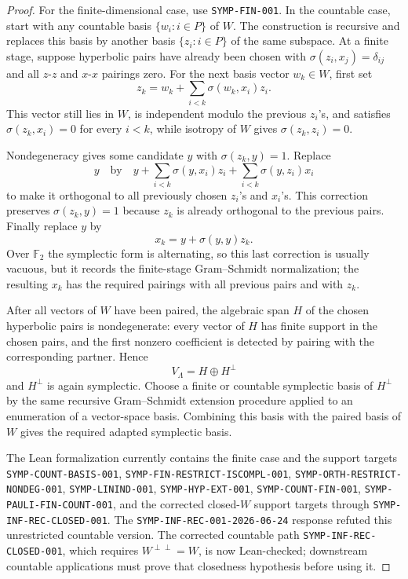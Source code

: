 \documentclass{article}
\newcommand{\Ftwo}{\mathbb F_2}
\begin{document}
\begin{proof}
For the finite-dimensional case, use \texttt{SYMP-FIN-001}.  In the countable
case, start with any countable basis \(\{w_i:i\in P\}\) of \(W\).  The
construction is recursive and replaces this basis by another basis
\(\{z_i:i\in P\}\) of the same subspace.  At a finite stage, suppose
hyperbolic pairs have already been chosen with
\(\sigma(z_i,x_j)=\delta_{ij}\) and all \(z\)-\(z\) and \(x\)-\(x\) pairings
zero.  For the next basis vector \(w_k\in W\), first set
\[
  z_k=w_k+\sum_{i<k}\sigma(w_k,x_i)z_i .
\]
This vector still lies in \(W\), is independent modulo the previous
\(z_i\)'s, and satisfies \(\sigma(z_k,x_i)=0\) for every \(i<k\), while
isotropy of \(W\) gives \(\sigma(z_k,z_i)=0\).

Nondegeneracy gives some candidate \(y\) with \(\sigma(z_k,y)=1\).  Replace
\[
  y\quad\text{by}\quad
  y+\sum_{i<k}\sigma(y,x_i)z_i+\sum_{i<k}\sigma(y,z_i)x_i
\]
to make it orthogonal to all previously chosen \(z_i\)'s and \(x_i\)'s.  This
correction preserves \(\sigma(z_k,y)=1\) because \(z_k\) is already orthogonal
to the previous pairs.  Finally replace \(y\) by
\[
  x_k=y+\sigma(y,y)z_k .
\]
Over \(\Ftwo\) the symplectic form is alternating, so this last correction is
usually vacuous, but it records the finite-stage Gram--Schmidt normalization;
the resulting \(x_k\) has the required pairings with all previous pairs and
with \(z_k\).

After all vectors of \(W\) have been paired, the algebraic span \(H\) of the
chosen hyperbolic pairs is nondegenerate: every vector of \(H\) has finite
support in the chosen pairs, and the first nonzero coefficient is detected by
pairing with the corresponding partner.  Hence
\[
  V_\Lambda=H\oplus H^\perp
\]
and \(H^\perp\) is again symplectic.  Choose a finite or countable symplectic
basis of \(H^\perp\) by the same recursive Gram--Schmidt extension procedure
applied to an enumeration of a vector-space basis.  Combining this basis with
the paired basis of \(W\) gives the required adapted symplectic basis.

The Lean formalization currently contains the finite case and the support
targets \texttt{SYMP-COUNT-BASIS-001},
\texttt{SYMP-FIN-RESTRICT-ISCOMPL-001},
\texttt{SYMP-ORTH-RESTRICT-NONDEG-001}, \texttt{SYMP-LININD-001},
\texttt{SYMP-HYP-EXT-001}, \texttt{SYMP-COUNT-FIN-001},
\texttt{SYMP-PAULI-FIN-COUNT-001}, and the corrected closed-\(W\) support
targets through \texttt{SYMP-INF-REC-CLOSED-001}.  The
\texttt{SYMP-INF-REC-001-2026-06-24} response refuted this unrestricted
countable version.  The corrected countable path
\texttt{SYMP-INF-REC-CLOSED-001}, which requires \(W^{\perp\perp}=W\), is
now Lean-checked; downstream countable applications must prove that closedness
hypothesis before using it.
\end{proof}
\end{document}

